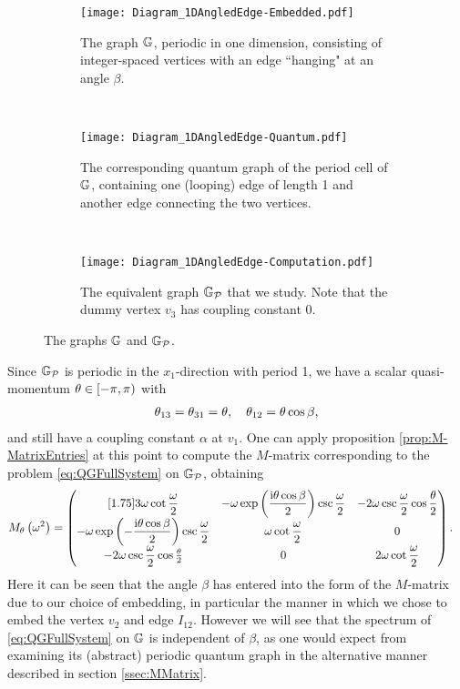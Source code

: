 \begin{figure}[b]
	\centering
	\begin{subfigure}[t]{0.3\textwidth}
		\centering
		\texttt{[image: Diagram\_1DAngledEdge-Embedded.pdf]}
		\caption{\label{fig:Diagram_1DAngledEdge-Embedded} The graph $\mathbb{G}$, periodic in one dimension, consisting of integer-spaced vertices with an edge ``hanging" at an angle $\beta$.}
	\end{subfigure}
	~
	\begin{subfigure}[t]{0.3\textwidth}
		\centering
		\texttt{[image: Diagram\_1DAngledEdge-Quantum.pdf]}
		\caption{\label{fig:Diagram_1DAngledEdge-Quantum} The corresponding quantum graph of the period cell of $\mathbb{G}$, containing one (looping) edge of length 1 and another edge connecting the two vertices.}
	\end{subfigure}
	~
	\begin{subfigure}[t]{0.3\textwidth}
		\centering
		\texttt{[image: Diagram\_1DAngledEdge-Computation.pdf]}	
		\caption{\label{fig:Diagram_1DAngledEdge-Computation} The equivalent graph $\mathbb{G}_{\mathcal{P}}$ that we study. Note that the dummy vertex $v_3$ has coupling constant 0.}
	\end{subfigure}
	\caption{\label{fig:Diagram_1DAngledEdgeExample} The graphs $\mathbb{G}$ and $\mathbb{G}_{\mathcal{P}}$.}
\end{figure}

Since $\mathbb{G}_{\mathcal{P}}$ is periodic in the $x_1$-direction with period 1, we have a scalar quasi-momentum $\theta\in\left[-\pi,\pi\right)$ with
\begin{align*}
	\theta_{13} = \theta_{31} = \theta, \quad \theta_{12} = \theta\cos\beta,
\end{align*}
and still have a coupling constant $\alpha$ at $v_1$. 
One can apply proposition \ref{prop:M-MatrixEntries} at this point to compute the $M$-matrix corresponding to the problem \eqref{eq:QGFullSystem} on $\mathbb{G}_{\mathcal{P}}$, obtaining
\begin{align} \label{eq:EmbeddedGraphMMatrix}
	M_\theta\left( \omega^2 \right) &=
	\begin{pmatrix}[1.75]
		3\omega\cot\dfrac{\omega}{2} & -\omega \exp\left( \dfrac{\mathrm{i}\theta\cos\beta}{2} \right)\csc\dfrac{\omega}{2} & -2\omega\csc\dfrac{\omega}{2}\cos\dfrac{\theta}{2} \\
		-\omega \exp\left( -\dfrac{\mathrm{i}\theta\cos\beta}{2} \right)\csc\dfrac{\omega}{2} & \omega\cot\dfrac{\omega}{2} & 0 \\
		-2\omega\csc\dfrac{\omega}{2}\cos\frac{\theta}{2} & 0 & 2\omega\cot\dfrac{\omega}{2}
	\end{pmatrix}.
\end{align}
Here it can be seen that the angle $\beta$ has entered into the form of the $M$-matrix due to our choice of embedding, in particular the manner in which we chose to embed the vertex $v_2$ and edge $I_{12}$.
However we will see that the spectrum of \eqref{eq:QGFullSystem} on $\mathbb{G}$ is independent of $\beta$, as one would expect from examining its (abstract) periodic quantum graph in the alternative manner described in section \ref{ssec:MMatrix}.

